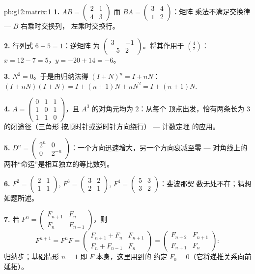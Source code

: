\begin{solution}{pb:g12:matrix:1}
\textbf{1.} $AB = \begin{pmatrix} 2 & 1\\ 4 & 3\end{pmatrix}$
而 $BA = \begin{pmatrix} 3 & 4\\ 1 & 2\end{pmatrix}$：矩阵
乘法不满足交换律 --- $B$ 右乘时交换列，
左乘时交换行。

\textbf{2.} 行列式 $6 - 5 = 1$：逆矩阵
为 $\begin{pmatrix} 3 & -1\\ -5 & 2\end{pmatrix}$。将其作用于
$\binom{4}{7}$：$x = 12 - 7 = 5$，$y = -20 + 14 = -6$。

\textbf{3.} $N^2 = 0$。于是由归纳法得 $(I + N)^n = I + nN$：
$(I + nN)(I + N) = I + (n+1)N + nN^2 = I + (n+1)N$.

\textbf{4.} $A = \begin{pmatrix} 0&1&1\\ 1&0&1\\ 1&1&0
\end{pmatrix}$，且 $A^3$ 的对角元均为 $2$：从每个
顶点出发，恰有两条长为 $3$ 的闭途径（三角形
按顺时针或逆时针方向绕行） --- 计数定理
的应用。

\textbf{5.} $D^n = \begin{pmatrix} 2^n & 0\\ 0 & 2^{-n}
\end{pmatrix}$：一个方向迅速增大，另一个方向衰减至零 ---
对角线上的两种“命运”是相互独立的等比数列。

\textbf{6.} $F^2 = \begin{pmatrix} 2 & 1\\ 1 & 1\end{pmatrix}$,
$F^3 = \begin{pmatrix} 3 & 2\\ 2 & 1\end{pmatrix}$,
$F^4 = \begin{pmatrix} 5 & 3\\ 3 & 2\end{pmatrix}$：斐波那契
数无处不在；猜想如题所述。

\textbf{7.} 若 $F^n = \begin{pmatrix} F_{n+1} & F_n\\ F_n &
F_{n-1}\end{pmatrix}$，则
\[
F^{n+1} = F^n F =
\begin{pmatrix} F_{n+1} + F_n & F_{n+1}\\
F_n + F_{n-1} & F_n \end{pmatrix}
= \begin{pmatrix} F_{n+2} & F_{n+1}\\ F_{n+1} & F_n
\end{pmatrix} :
\]
归纳步；基础情形 $n = 1$ 即 $F$ 本身，这里用到的
约定 $F_0 = 0$（它将递推关系向前延拓）。


\end{solution}
